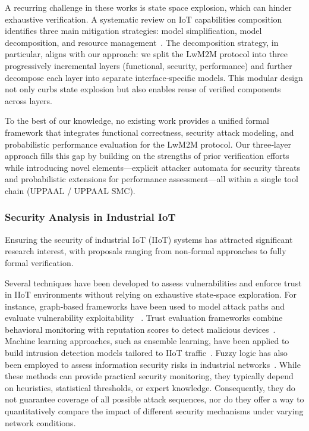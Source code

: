 \documentclass[a4paper,fleqn]{cas-sc}
\begin{document}
A recurring challenge in these works is state space explosion, which can hinder exhaustive verification. A systematic review on IoT capabilities composition identifies three main mitigation strategies: model simplification, model decomposition, and resource management~\cite{halba2023iot}. The decomposition strategy, in particular, aligns with our approach: we split the LwM2M protocol into three progressively incremental layers (functional, security, performance) and further decompose each layer into separate interface‑specific models. This modular design not only curbs state explosion but also enables reuse of verified components across layers.

To the best of our knowledge, no existing work provides a unified formal framework that integrates functional correctness, security attack modeling, and probabilistic performance evaluation for the LwM2M protocol. Our three‑layer approach fills this gap by building on the strengths of prior verification efforts while introducing novel elements—explicit attacker automata for security threats and probabilistic extensions for performance assessment—all within a single tool chain (UPPAAL / UPPAAL SMC).

\subsubsection{Security Analysis in Industrial IoT}
Ensuring the security of industrial IoT (IIoT) systems has attracted significant research interest, with proposals ranging from non‑formal approaches to fully formal verification.

Several techniques have been developed to assess vulnerabilities and enforce trust in IIoT environments without relying on exhaustive state‑space exploration. For instance, graph‑based frameworks have been used to model attack paths and evaluate vulnerability exploitability ~\cite{george2018graph}. Trust evaluation frameworks combine behavioral monitoring with reputation scores to detect malicious devices~\cite{wang2022toward}. Machine learning approaches, such as ensemble learning, have been applied to build intrusion detection models tailored to IIoT traffic~\cite{mohy2023ensemble}. Fuzzy logic has also been employed to assess information security risks in industrial networks~\cite{kerimkhulle2023fuzzy}. While these methods can provide practical security monitoring, they typically depend on heuristics, statistical thresholds, or expert knowledge. Consequently, they do not guarantee coverage of all possible attack sequences, nor do they offer a way to quantitatively compare the impact of different security mechanisms under varying network conditions.
\end{document}
